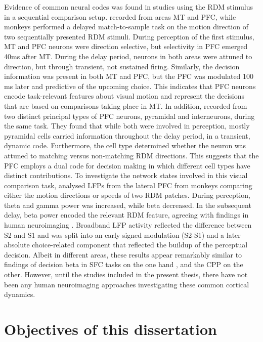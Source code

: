 Evidence of common neural codes was found in studies using the RDM stimulus in a sequential comparison setup. \textcite{Zaksas2006} recorded from areas MT and PFC, while monkeys performed a delayed match-to-sample task on the motion direction of two sequentially presented RDM stimuli. During perception of the first stimulus, MT and PFC neurons were direction selective, but selectivity in PFC emerged 40ms after MT. During the delay period, neurons in both areas were attuned to direction, but through transient, not sustained firing. Similarly, the decision information was present in both MT and PFC, but the PFC was modulated 100 ms later and predictive of the upcoming choice. This indicates that PFC neurons encode task-relevant features about visual motion and represent the decisions that are based on comparisons taking place in MT. In addition, \textcite{Hussar2012} recorded from two distinct principal types of PFC neurons, pyramidal and interneurons, during the same task. They found that while both were involved in perception, mostly pyramidal cells carried information throughout the delay period, in a transient, dynamic code. Furthermore, the cell type determined whether the neuron was attuned to matching versus non-matching RDM directions. This suggests that the PFC employs a dual code for decision making in which different cell types have distinct contributions. To investigate the network states involved in this visual comparison task, \textcite{Wimmer2016} analysed LFPs from the lateral PFC from monkeys comparing either the motion directions or speeds of two RDM patches. During perception, theta and gamma power was increased, while beta decreased. In the subsequent delay, beta power encoded the relevant RDM feature, agreeing with findings in human neuroimaging \parencite{Spitzer2010,Spitzer2012}. Broadband LFP activity reflected the difference between S2 and S1 and was split into an early signed modulation (S2-S1) and a later absolute choice-related component that reflected the buildup of the perceptual decision. Albeit in different areas, these results appear remarkably similar to findings of decision beta in SFC tasks on the one hand \parencite{Haegens2011,Herding2016}, and the CPP \parencite{Kelly2013} on the other. However, until the studies included in the present thesis, there have not been any human neuroimaging approaches investigating these common cortical dynamics. 

\section{Objectives of this dissertation}

